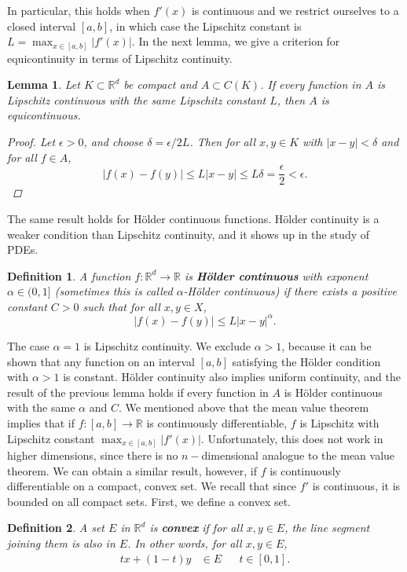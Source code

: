 \documentclass[12pt]{amsart}         %
\newtheorem{definition}{Definition}[section]
\newtheorem{lemma}{Lemma}[section]
\theoremstyle{remark}
\newcommand{\R}{\mathbb{R}}
\begin{document}
In particular, this holds when $f'(x)$ is continuous and we restrict ourselves to a closed interval $[a, b]$, in which case the Lipschitz constant is $L = \max_{x\in[a,b]} |f'(x)|$. In the next lemma, we give a criterion for equicontinuity in terms of Lipschitz continuity.

\begin{lemma}
Let $K \subset \R^d$ be compact and $A \subset C(K)$. If every function in $A$ is Lipschitz continuous with the same Lipschitz constant $L$, then $A$ is equicontinuous.
\begin{proof}
Let $\epsilon > 0$, and choose $\delta = \epsilon/2L$. Then for all $x, y \in K$ with $|x-y| < \delta$ and for all $f \in A$,
\[
|f(x) - f(y)| \leq L|x-y| \leq L\delta = \frac{\epsilon}{2} < \epsilon.
\]
\end{proof}
\end{lemma}

The same result holds for H\"{o}lder continuous functions. H\"{o}lder continuity is a weaker condition than Lipschitz continuity, and it shows up in the study of PDEs.

\begin{definition}
A function $f: \R^d \rightarrow \R$ is \textbf{H\"{o}lder continuous} with exponent $\alpha \in (0, 1]$ (sometimes this is called $\alpha$-H\"{o}lder continuous) if there exists a positive constant $C > 0$ such that for all $x, y \in X$,
\[
|f(x) - f(y)| \leq L |x - y|^\alpha.
\]
\end{definition}

The case $\alpha = 1$ is Lipschitz continuity. We exclude $\alpha > 1$, because it can be shown that any function on an interval $[a, b]$ satisfying the H\"{o}lder condition with $\alpha > 1$ is constant. H\"{o}lder continuity also implies uniform continuity, and the result of the previous lemma holds if every function in $A$ is H\"{o}lder continuous with the same $\alpha$ and $C$. We mentioned above that the mean value theorem implies that if $f: [a, b] \rightarrow \R$ is continuously differentiable, $f$ is Lipschitz with Lipschitz constant $\max_{x\in [a,b]}|f'(x)|$.  Unfortunately, this does not work in higher dimensions, since there is no $n-$dimensional analogue to the mean value theorem.  We can obtain a similar result, however, if $f$ is continuously differentiable on a compact, convex set. We recall that since $f'$ is continuous, it is bounded on all compact sets. First, we define a convex set.

\begin{definition}
A set $E$ in $\R^d$ is \textbf{convex} if for all $x, y \in E$, the line segment joining them is also in $E$. In other words, for all $x, y \in E$,
\begin{align*}
tx + (1 - t)y &\in E && t \in [0, 1].
\end{align*}
\end{definition}
\end{document}

